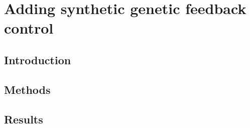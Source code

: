 \documentclass[../main.tex]{subfiles}
\begin{document}
\chapter{Adding synthetic genetic feedback control}
\label{chapter5}
\section{Introduction}
\label{chapter5:introduction}
\section{Methods}
\label{chapter5:methods}
\section{Results}
\label{chapter5:results}
\end{document}
